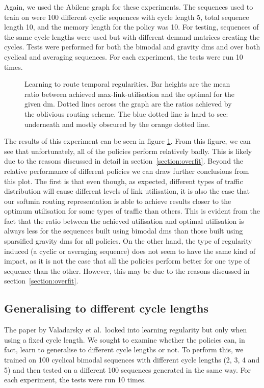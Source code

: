 Again, we used the Abilene graph for these experiments. The sequences used to train on were 100 different cyclic sequences with cycle length 5, total sequence length 10, and the memory length for the policy was 10. For testing, sequences of the same cycle lengths were used but with different demand matrices creating the cycles. Tests were performed for both the bimodal and gravity \acp{dm} and over both cyclical and averaging sequences. For each experiment, the tests were run 10 times.

\begin{figure}
    \centering
    \resizebox{\textwidth}{!}{}
    \caption{Learning to route temporal regularities. Bar heights are the mean ratio between achieved max-link-utilisation and the optimal for the given \ac{dm}. Dotted lines across the graph are the ratios achieved by the oblivious routing scheme. The blue dotted line is hard to see: underneath and mostly obscured by the orange dotted line.}
    \label{fig:exp_cyclic}
\end{figure}

The results of this experiment can be seen in figure \ref{fig:exp_cyclic}. From this figure, we can see that unfortunately, all of the policies perform relatively badly. This is likely due to the reasons discussed in detail in section~\ref{section:overfit}. Beyond the relative performance of different policies we can draw further conclusions from this plot. The first is that even though, as expected, different types of traffic distribution will cause different levels of link utilisation, it is also the case that our softmin routing representation is able to achieve results closer to the optimum utilisation for some types of traffic than others. This is evident from the fact that the ratio between the achieved utilisation and optimal utilisation is always less for the sequences built using bimodal \acp{dm} than those built using sparsified gravity \acp{dm} for all policies. On the other hand, the type of regularity induced (a cyclic or averaging sequence) does not seem to have the same kind of impact, as it is not the case that all the policies perform better for one type of sequence than the other. However, this may be due to the reasons discussed in section~\ref{section:overfit}.

\subsection{Generalising to different cycle lengths}
The paper by Valadarsky et al.\ looked into learning regularity but only when using a fixed cycle length. We sought to examine whether the policies can, in fact, learn to generalise to different cycle lengths or not. To perform this, we trained on 100 cyclical bimodal sequences with different cycle lengths (2, 3, 4 and 5) and then tested on a different 100 sequences generated in the same way. For each experiment, the tests were run 10 times.

